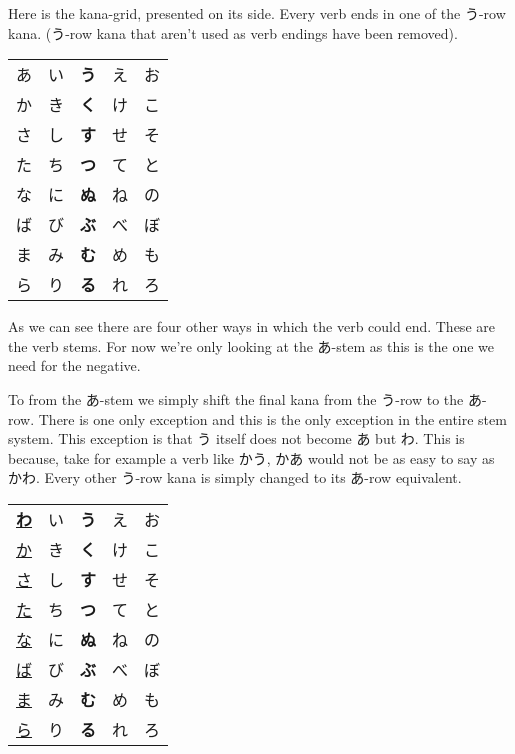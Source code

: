 \documentclass[11pt]{article}
\begin{document}
Here is the kana-grid, presented on its side. Every verb ends in one of the う-row kana. (う-row kana that aren't used as verb endings have been removed).

\begin{center}
\begin{tabular}{lllll}
あ & い & \textbf{う} & え & お\\
か & き & \textbf{く} & け & こ\\
さ & し & \textbf{す} & せ & そ\\
た & ち & \textbf{つ} & て & と\\
な & に & \textbf{ぬ} & ね & の\\
ば & び & \textbf{ぶ} & べ & ぼ\\
ま & み & \textbf{む} & め & も\\
ら & り & \textbf{る} & れ & ろ\\
\end{tabular}
\end{center}

As we can see there are four other ways in which the verb could end. These are the verb stems. For now we're only looking at the あ-stem as this is the one we need for the negative.

To from the あ-stem we simply shift the final kana from the う-row to the あ-row. There is one only exception and this is the only exception in the entire stem system. This exception is that う itself does not become あ but わ. This is because, take for example a verb like かう, かあ would not be as easy to say as かわ. Every other う-row kana is simply changed to its あ-row equivalent.

\begin{center}
\begin{tabular}{lllll}
\uline{\textbf{わ}} & い & \textbf{う} & え & お\\
\uline{か} & き & \textbf{く} & け & こ\\
\uline{さ} & し & \textbf{す} & せ & そ\\
\uline{た} & ち & \textbf{つ} & て & と\\
\uline{な} & に & \textbf{ぬ} & ね & の\\
\uline{ば} & び & \textbf{ぶ} & べ & ぼ\\
\uline{ま} & み & \textbf{む} & め & も\\
\uline{ら} & り & \textbf{る} & れ & ろ\\
\end{tabular}
\end{center}
\end{document}
